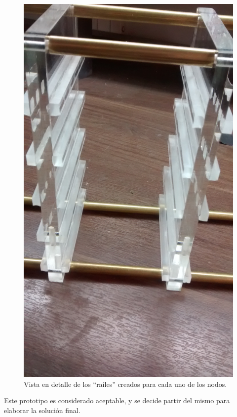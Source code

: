 \begin{figure}[H]
\centering
\includegraphics{Chapter5/Figures/prototipo1vistadetalle}
\caption[Vista en detalle de los ``raíles'' del primer prototipo.]{Vista en detalle de los ``raíles'' creados para cada uno de los nodos.}
\end{figure}

Este prototipo es considerado aceptable, y se decide partir del mismo para elaborar la solución final.


